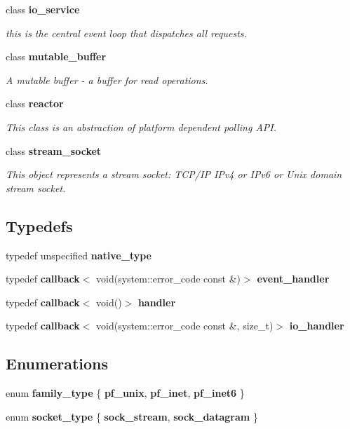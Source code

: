 \begin{DoxyCompactItemize}
class {\bf io\+\_\+service}
\begin{DoxyCompactList}\small\item\em this is the central event loop that dispatches all requests. \end{DoxyCompactList}\item 
class {\bf mutable\+\_\+buffer}
\begin{DoxyCompactList}\small\item\em A mutable buffer -\/ a buffer for read operations. \end{DoxyCompactList}\item 
class {\bf reactor}
\begin{DoxyCompactList}\small\item\em This class is an abstraction of platform dependent polling A\+PI. \end{DoxyCompactList}\item 
class {\bf stream\+\_\+socket}
\begin{DoxyCompactList}\small\item\em This object represents a stream socket\+: T\+C\+P/\+IP I\+Pv4 or I\+Pv6 or Unix domain stream socket. \end{DoxyCompactList}\end{DoxyCompactItemize}
\subsection*{Typedefs}
\begin{DoxyCompactItemize}
\item 
typedef unspecified {\bf native\+\_\+type}
\item 
typedef {\bf callback}$<$ void(system\+::error\+\_\+code const \&)$>$ {\bf event\+\_\+handler}
\item 
typedef {\bf callback}$<$ void()$>$ {\bf handler}
\item 
typedef {\bf callback}$<$ void(system\+::error\+\_\+code const \&, size\+\_\+t)$>$ {\bf io\+\_\+handler}
\end{DoxyCompactItemize}
\subsection*{Enumerations}
\begin{DoxyCompactItemize}
\item 
enum {\bf family\+\_\+type} \{ {\bfseries pf\+\_\+unix}, 
{\bfseries pf\+\_\+inet}, 
{\bfseries pf\+\_\+inet6}
 \}
\item 
enum {\bf socket\+\_\+type} \{ {\bfseries sock\+\_\+stream}, 
{\bfseries sock\+\_\+datagram}
 \}
\end{DoxyCompactItemize}
